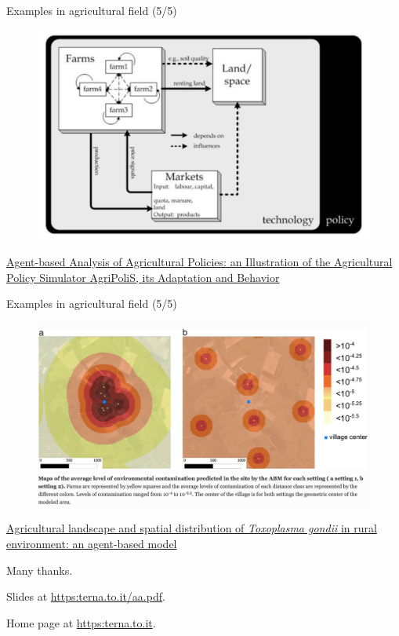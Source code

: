 \documentclass[9pt]{beamer}
\begin{document}
\begin{frame}{Examples in agricultural field (5/5)}

\begin{figure}[H]
\center
\includegraphics[scale=0.36]{agr4.png}
\label{agr4}
\end{figure}

\href{https://www.jstor.org/stable/26267800}{Agent-based Analysis of Agricultural Policies: an Illustration of the Agricultural Policy Simulator AgriPoliS, its Adaptation and Behavior}

\end{frame}

\begin{frame}{Examples in agricultural field (5/5)}

\begin{figure}[H]
\center
\includegraphics[scale=0.25]{agr5.png}
\label{agr5}
\end{figure}

\href{https://link.springer.com/article/10.1186/1476-072X-13-45}{Agricultural landscape and spatial distribution of \emph{Toxoplasma gondii} in rural environment: an agent-based model}

\end{frame}

\begin{frame}{}


Many thanks.

\bigskip

Slides at \url{https:terna.to.it/aa.pdf}.

\bigskip

Home page at \url{https:terna.to.it}.


\end{frame}
\end{document}
